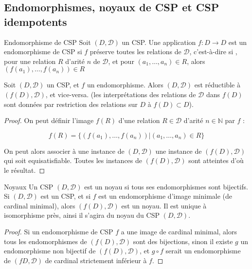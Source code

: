 \subsection{Endomorphismes, noyaux de CSP et CSP idempotents}

\begin{defi}{Endomorphisme de CSP}
Soit $(D,\mathcal{D})$ un CSP. Une application $f : D \rightarrow D$ est un endomorphisme de CSP si $f$ préserve toutes les relations de $\mathcal{D}$, c'est-à-dire si , pour une relation $R$ d'arité $n$ de $\mathcal{D}$, et pour $(a_1,\dots,a_n) \in R$, alors $(f(a_1),\dots,f(a_n)) \in R$
\end{defi}

\begin{prop}
Soit $(D,\mathcal{D})$ un CSP, et $f$ un endomorphisme. Alors $(D,\mathcal{D})$ est réductible à $(f(D),\mathcal{D})$, et vice-versa. (les interprétations des relations de $\mathcal{D}$ dans $f(D)$ sont données par restriction des relations sur $D$ à $f(D) \subset D$).
\end{prop}

\begin{proof}
On peut définir l'image $f(R)$ d'une relation $R \in \mathcal{D}$ d'arité $n \in \mathbb{N}$ par $f$ :

$$ f(R) = \{ (f(a_1),\dots,f(a_n))| (a_1,\dots,a_n) \in R\}$$

On peut alors associer à une instance de $(D,\mathcal{D})$ une instance de $(f(D),\mathcal{D})$ qui soit equisatisfiable. Toutes les instances de $(f(D),\mathcal{D})$ sont atteintes d'où le résultat.
\end{proof}

\begin{defi}{Noyaux}
Un CSP $(D,\mathcal{D})$ est un noyau si tous ses endomorphismes sont bijectifs. Si $(D,\mathcal{D})$ est un CSP, et si $f$ est un endomorphisme d'image minimale (de cardinal minimal), alors $(f(D),\mathcal{D})$ est un noyau. Il est unique à isomorphisme près, ainsi il s'agira du noyau du CSP $(D,\mathcal{D})$.
\end{defi}

\begin{proof}
Si un endomorphisme de CSP $f$ a une image de cardinal minimal, alors tous les endomorphismes de $(f(D),\mathcal{D})$ sont des bijections, sinon il existe $g$ un endomorphisme non bijectif de $(f(D),\mathcal{D})$, et $g \circ f$ serait un endomorphisme de $(fD,\mathcal{D})$ de cardinal strictement inférieur à $f$.
\end{proof}

